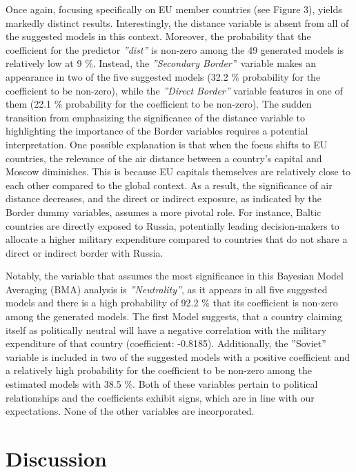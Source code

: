 \documentclass[12pt,a4paper]{article}
\begin{document}
Once again, focusing specifically on EU member countries (see Figure 3), yields markedly distinct results. Interestingly, the distance variable is absent from all of the suggested models in this context. Moreover, the probability that the coefficient for the predictor \textit{''dist''} is non-zero among the 49 generated models is relatively low at 9 \%. Instead, the \textit{''Secondary Border'}' variable makes an appearance in two of the five suggested models (32.2 \% probability for the coefficient to be non-zero), while the \textit{''Direct Border''} variable features in one of them (22.1 \% probability for the coefficient to be non-zero). The sudden transition from emphasizing the significance of the distance variable to highlighting the importance of the Border variables requires a potential interpretation. One possible explanation is that when the focus shifts to EU countries, the relevance of the air distance between a country's capital and Moscow diminishes. This is because EU capitals themselves are relatively close to each other compared to the global context. As a result, the significance of air distance decreases, and the direct or indirect exposure, as indicated by the Border dummy variables, assumes a more pivotal role. For instance, Baltic countries are directly exposed to Russia, potentially leading decision-makers to allocate a higher military expenditure compared to countries that do not share a direct or indirect border with Russia.

Notably, the variable that assumes the most significance in this Bayesian Model Averaging (BMA) analysis is \textit{''Neutrality''}, as it appears in all five suggested models and there is a high probability of 92.2 \% that its coefficient is non-zero among the generated models. The first Model suggests, that a country claiming itself as politically neutral will have a negative correlation with the military expenditure of that country (coefficient: -0.8185). Additionally, the ''Soviet'' variable is included in two of the suggested models with a positive coefficient and a relatively high probability for the coefficient to be non-zero among the estimated models with 38.5 \%.  Both of these variables pertain to political relationships and the coefficients exhibit signs, which are in line with our expectations. None of the other variables are incorporated.


\section{Discussion}
\end{document}
